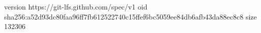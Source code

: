 version https://git-lfs.github.com/spec/v1
oid sha256:a52d93dc80faa96ff7fb612522740c15ffef6bc5059ee84db6afb43da88ec8c8
size 132306
